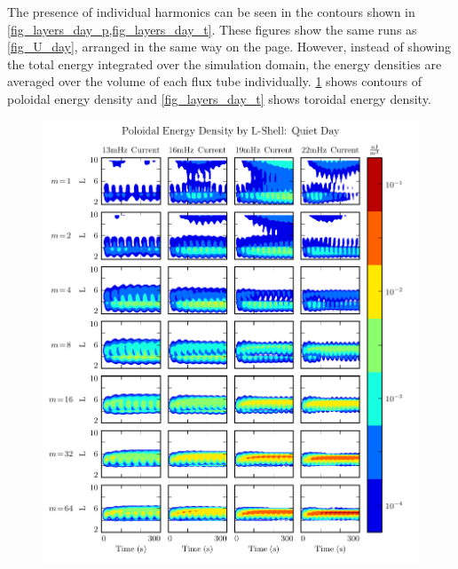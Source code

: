 The presence of individual harmonics can be seen in the contours shown in \cref{fig_layers_day_p,fig_layers_day_t}. These figures show the same runs as \cref{fig_U_day}, arranged in the same way on the page. However, instead of showing the total energy integrated over the simulation domain, the energy densities are averaged over the volume of each flux tube individually. \cref{fig_layers_day_p} shows contours of poloidal energy density and \cref{fig_layers_day_t} shows toroidal energy density. 

\begin{figure}[!htb]
    \centering
    \includegraphics[width=\textwidth]{figures/layers_day_p.pdf}
    \caption[Dayside Poloidal Energy Distribution]{
    }
    \label{fig_layers_day_p}
\end{figure}

